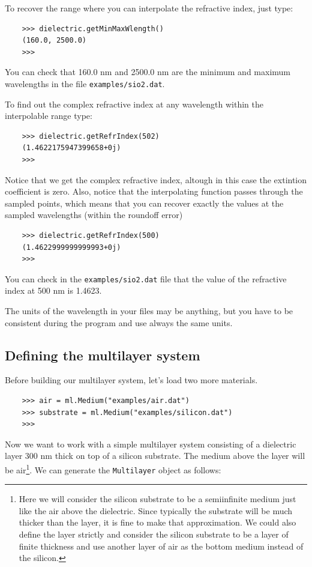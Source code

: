 \documentclass[a4paper,11pt,aps,final]{revtex4}
\begin{document}
To recover the range where you can interpolate the refractive index, just type:

\begin{verbatim}
    >>> dielectric.getMinMaxWlength()
    (160.0, 2500.0)
    >>>
\end{verbatim}

You can check that 160.0 nm and 2500.0 nm are the minimum and maximum wavelengths in the file \texttt{examples/sio2.dat}.

To find out the complex refractive index at any wavelength within the interpolable range type:

\begin{verbatim}
    >>> dielectric.getRefrIndex(502)
    (1.4622175947399658+0j)
    >>>
\end{verbatim}

Notice that we get the complex refractive index, altough in this case the extintion coefficient is zero. Also, notice that the interpolating function passes through the sampled points, which means that you can recover exactly the values at the sampled wavelengths (within the roundoff error)

\begin{verbatim}
    >>> dielectric.getRefrIndex(500)
    (1.4622999999999993+0j)
    >>>
\end{verbatim}

You can check in the \texttt{examples/sio2.dat} file that the value of the refractive index at 500 nm is 1.4623.

The units of the wavelength in your files may be anything, but you have to be consistent during the program and use always the same units.

\subsection{Defining the multilayer system} \label{sub:define_multilayer}

Before building our multilayer system, let's load two more materials.

\begin{verbatim}
    >>> air = ml.Medium("examples/air.dat")
    >>> substrate = ml.Medium("examples/silicon.dat")
    >>>
\end{verbatim}

Now we want to work with a simple multilayer system consisting of a dielectric layer 300 nm thick on top of a silicon substrate. The medium above the layer will be air\footnote{Here we will consider the silicon substrate to be a semiinfinite medium just like the air above the dielectric. Since typically the substrate will be much thicker than the layer, it is fine to make that approximation. We could also define the layer strictly and consider the silicon substrate to be a layer of finite thickness and use another layer of air as the bottom medium instead of the silicon.}. We can generate the \texttt{Multilayer} object as follows:
\end{document}
